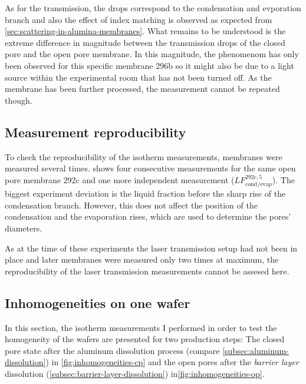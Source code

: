 \documentclass[../thesis.tex]{subfiles}
\begin{document}
        As for the transmission, the drops correspond to the condensation and evporation branch and also the effect of index matching is observed as expected from \cref{sec:scattering-in-alumina-membranes}. What remains to be understood is the extreme difference in magnitude between the transmission drops of the closed pore and the open pore membrane. In this magnitude, the phenomenom has only been observed for this specific membrane 296b so it might also be due to a light source within the experimental room that has not been turned off. As the membrane has been further processed, the measurement cannot be repeated though.


    \subsection{Measurement reproducibility}
    \label{subsec:measurement-reproducibility}

        

        To check the reproducibility of the isotherm measurements, membranes were measured several times.  shows four consecutive measurements for the same open pore membrane 292c and one more independent measurement ($LF_\mathrm{cond/evap}^\mathrm{292c,5}$). The biggest experiment deviation is the liquid fraction before the sharp rise of the condensation branch. However, this does not affect the position of the condensation and the evaporation rises, which are used to determine the pores' diameters.
        \medskip

        As at the time of these experiments the laser transmission setup had not been in place and later membranes were measured only two times at maximum, the reproducibility of the laser transmission measurements cannot be assesed here.


    \subsection{Inhomogeneities on one wafer}
    \label{subsec:wafer-inhomogeneities}

        
        

        In this section, the isotherm measurements I performed in order to test the homogeneity of the wafers are presented for two production steps: The closed pore state after the aluminum dissolution process (compare \cref{subsec:aluminum-dissolution}) in \cref{fig:inhomogeneities-cp} and the open pores after the \textit{barrier layer} dissolution (\cref{subsec:barrier-layer-dissolution}) in\cref{fig:inhomogeneities-op}.
\end{document}

